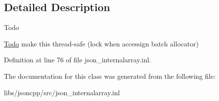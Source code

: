 \subsection{Detailed Description}
\begin{DoxyRefDesc}{Todo}
\item[\hyperlink{todo__todo000001}{Todo}]make this thread-\/safe (lock when accessign batch allocator) \end{DoxyRefDesc}


Definition at line 76 of file json\-\_\-internalarray.\-inl.



The documentation for this class was generated from the following file\-:\begin{DoxyCompactItemize}
\item 
libs/jsoncpp/src/json\-\_\-internalarray.\-inl\end{DoxyCompactItemize}
